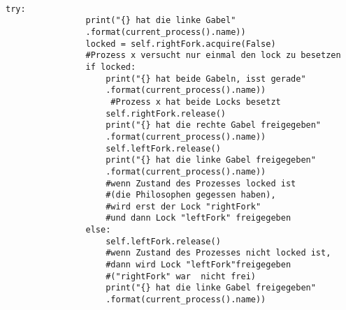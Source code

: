 \begin{lstlisting}[style = Python, label = {rechte_gabel}, caption = {nichtblockierender Code bei Versuch die rechte Gaabel anzufordern}]

try:
                print("{} hat die linke Gabel"
                .format(current_process().name))
                locked = self.rightFork.acquire(False) 
                #Prozess x versucht nur einmal den lock zu besetzen
                if locked:
                    print("{} hat beide Gabeln, isst gerade"
                    .format(current_process().name)) 
                     #Prozess x hat beide Locks besetzt
                    self.rightFork.release() 
                    print("{} hat die rechte Gabel freigegeben"
                    .format(current_process().name)) 
                    self.leftFork.release() 
                    print("{} hat die linke Gabel freigegeben"
                    .format(current_process().name))
                    #wenn Zustand des Prozesses locked ist
                    #(die Philosophen gegessen haben),
                    #wird erst der Lock "rightFork" 
                    #und dann Lock "leftFork" freigegeben
                else:
                    self.leftFork.release() 
                    #wenn Zustand des Prozesses nicht locked ist,
                    #dann wird Lock "leftFork"freigegeben
                    #("rightFork" war  nicht frei)
                    print("{} hat die linke Gabel freigegeben"
                    .format(current_process().name))  


\end{lstlisting}
 







